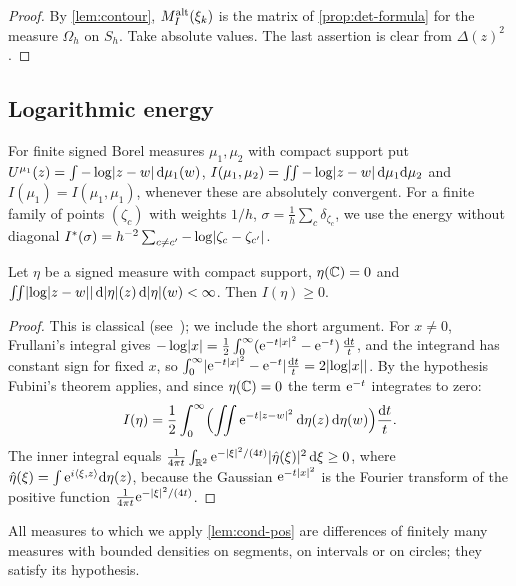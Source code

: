 \begin{proof}
By \cref{lem:contour}, $M^{\mathrm{alt}}_I(\xi_k)$ is the matrix of \cref{prop:det-formula} for the
measure $\Omega_h$ on $S_h$. Take absolute values. The last assertion is clear from
$\Delta(z)^2$.
\end{proof}

\subsection{Logarithmic energy}\label{subsec:energy-prelim}

For finite signed Borel measures $\mu_1,\mu_2$ with compact support put
$U^{\mu_1}(z)=\int-\log\lvert z-w\rvert\,\mathrm{d}\mu_1(w)$,
$I(\mu_1,\mu_2)=\iint-\log\lvert z-w\rvert\,\mathrm{d}\mu_1\mathrm{d}\mu_2$ and $I(\mu_1)=I(\mu_1,\mu_1)$, whenever
these are absolutely convergent. For a finite family of points $(\zeta_c)$ with weights $1/h$,
$\sigma=\frac1h\sum_c\delta_{\zeta_c}$, we use the energy without diagonal
$I^*(\sigma)=h^{-2}\sum_{c\ne c'}-\log\lvert \zeta_c-\zeta_{c'}\rvert$.

\begin{lemma}\label{lem:cond-pos}
Let $\eta$ be a signed measure with compact support, $\eta(\mathbb{C})=0$ and
$\iint\lvert \log\lvert z-w\rvert\rvert\,\mathrm{d}\lvert \eta\rvert(z)\,\mathrm{d}\lvert \eta\rvert(w)<\infty$. Then $I(\eta)\ge0$.
\end{lemma}

\begin{proof}
This is classical (see~\cite{SaffTotik1997}); we include the short argument. For $x\ne0$,
Frullani's integral gives $-\log\lvert x\rvert=\frac12\int_0^\infty(\mathrm{e}^{-t\lvert x\rvert^2}-\mathrm{e}^{-t})\,\frac{\mathrm{d} t}t$,
and the integrand has constant sign for fixed $x$, so
$\int_0^\infty\lvert \mathrm{e}^{-t\lvert x\rvert^2}-\mathrm{e}^{-t}\rvert\frac{\mathrm{d} t}t=2\lvert \log\lvert x\rvert\rvert$. By the hypothesis
Fubini's theorem applies, and since $\eta(\mathbb{C})=0$ the term $\mathrm{e}^{-t}$ integrates to zero:
\[
  I(\eta)=\frac12\int_0^\infty\Bigl(\iint\mathrm{e}^{-t\lvert z-w\rvert^2}\,\mathrm{d}\eta(z)\,\mathrm{d}\eta(w)\Bigr)\frac{\mathrm{d} t}t .
\]
The inner integral equals $\frac1{4\pi t}\int_{\mathbb{R}^2}\mathrm{e}^{-\lvert \xi\rvert^2/(4t)}\lvert \hat\eta(\xi)\rvert^2\,\mathrm{d}\xi\ge0$,
where $\hat\eta(\xi)=\int\mathrm{e}^{i\langle\xi,z\rangle}\mathrm{d}\eta(z)$, because the Gaussian
$\mathrm{e}^{-t\lvert x\rvert^2}$ is the Fourier transform of the positive function
$\frac1{4\pi t}\mathrm{e}^{-\lvert \xi\rvert^2/(4t)}$.
\end{proof}

All measures to which we apply \cref{lem:cond-pos} are differences of finitely many measures
with bounded densities on segments, on intervals or on circles; they satisfy its hypothesis.

